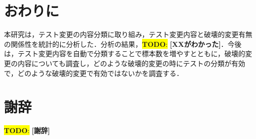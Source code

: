\documentclass[uplatex,dvipdfmx,a4paper,twocolumn,base=11pt,jbase=11pt,ja=standard]{bxjsarticle}  %
\newcommand{\todo}[1]{\colorbox{yellow}{{\bf TODO}:}{\color{red} {\textbf{[#1]}}}}
\begin{document}
\section{おわりに}

本研究は，テスト変更の内容分類に取り組み，テスト変更内容と破壊的変更有無の関係性を統計的に分析した．分析の結果，\todo{XXがわかった}．今後は，テスト変更内容を自動で分類することで標本数を増やすとともに，破壊的変更の内容についても調査し，どのような破壊的変更の時にテストの分類が有効で，どのような破壊的変更で有効ではないかを調査する．

\section*{謝辞}

\todo{謝辞}

 
\end{document}
